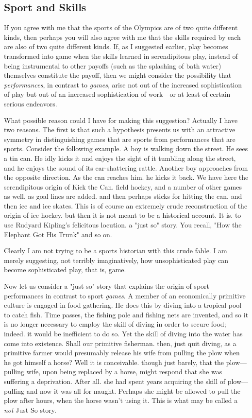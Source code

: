 \documentclass{tufte-handout}
\begin{document}
\subsection{Sport and Skills}

If you agree with me that the sports of the Olympics are of two quite different kinds, then perhaps you will also agree with me that the skills required by each are also of two quite different kinds. If, as I suggested earlier, play becomes transformed into game when the skills learned in serendipitous play, instead of being instrumental to other payoffs (such as the splashing of bath water) themselves constitute the payoff, then we might consider the possibility that \textit{performances}, in contrast to \textit{games}, arise not out of the increased sophistication of play but out of an increased sophistication of work---or at least of certain serious endeavors. 

What possible reason could I have for making this suggestion? Actually I have two reasons. The first is that such a hypothesis presents us with an attractive symmetry in distinguishing games that are sports from performances that are sports. Consider the following example. A boy is walking down the street. He sees a tin can. He idly kicks it and enjoys the sight of it tumbling along the street, and he enjoys the sound of its ear-shattering rattle. Another boy approaches from the opposite direction. As the can reaches him. he kicks it back. We have here the serendipitous origin of Kick the Can. field hockey, and a number of other games as well, as goal lines are added. and then perhaps sticks for hitting the can. and then ice and ice skates. This is of course an extremely crude reconstruction of the origin of ice hockey. but then it is not meant to be a historical account. It is. to use Rudyard Kipling’s felicitous locution. a "just so" story. You recall, "How the Elephant Got His Trunk" and so on.

Clearly I am not trying to be a sports historian with this crude fable. I am merely suggesting, not terribly imaginatively, how unsophisticated play can become sophisticated play, that is, game. 

Now let us consider a "just so" story that explains the origin of sport performances in contrast to sport \textit{games}. A member of an economically primitive culture is engaged in food gathering. He does this by diving into a tropical pool to catch fish. Time passes, the fishing pole and fishing nets are invented, and so it is no longer necessary to employ the skill of diving in order to secure food; indeed. it would be inefficient to do so. Yet the skill of diving into the water has come into existence. Shall our primitive fisherman. then, just quit diving, as a primitive farmer would presumably release his wife from pulling the plow when he got himself a horse? Well it is conceivable. though just barely, that the plow—pulling wife, upon being replaced by a horse, might respond that she was suffering a deprivation. After all. she had spent years acquiring the skill of plow—pulling and now it was all for naught. Perhaps she might be allowed to pull the plow after hours, when the horse wasn't using it. This is what may be called a \textit{not} Just So story. 
\end{document}
